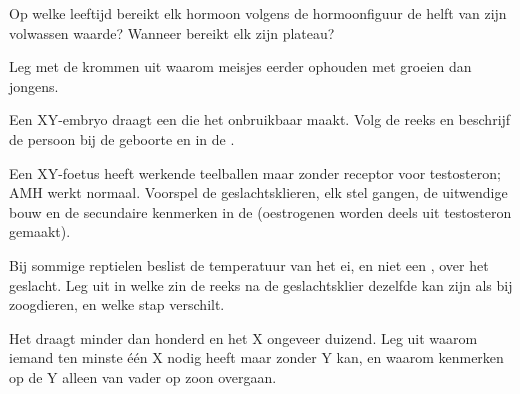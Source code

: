 \begin{exercise}[$\star\star$]\label{exo:g11:becoming-male-female:9}
Op welke leeftijd bereikt elk hormoon volgens de hormoonfiguur de helft
van zijn volwassen waarde? Wanneer bereikt elk zijn plateau?
\end{exercise}

\begin{exercise}[$\star\star$]\label{exo:g11:becoming-male-female:10}
Leg met de krommen uit waarom meisjes eerder ophouden met groeien dan
jongens.
\end{exercise}

\begin{exercise}[$\star\star$]\label{exo:g11:becoming-male-female:11}
Een XY-embryo draagt een  die het  onbruikbaar maakt.
Volg de reeks en beschrijf de persoon bij de geboorte en in de .
\end{exercise}

\begin{exercise}[$\star\star\star$]\label{exo:g11:becoming-male-female:12}
Een XY-foetus heeft werkende teelballen maar  zonder receptor voor
testosteron; AMH werkt normaal. Voorspel de geslachtsklieren, elk stel
gangen, de uitwendige bouw en de secundaire kenmerken in de 
(oestrogenen worden deels uit testosteron gemaakt).
\end{exercise}

\begin{exercise}[$\star\star\star$]\label{exo:g11:becoming-male-female:13}
Bij sommige reptielen beslist de temperatuur van het ei, en niet een
, over het geslacht. Leg uit in welke zin de reeks na de
geslachtsklier dezelfde kan zijn als bij zoogdieren, en welke stap
verschilt.
\end{exercise}

\begin{exercise}[$\star\star\star$]\label{exo:g11:becoming-male-female:14}
Het  draagt minder dan honderd  en het X ongeveer
duizend. Leg uit waarom iemand ten minste één X nodig heeft maar zonder Y
kan, en waarom kenmerken op de Y alleen van vader op zoon overgaan.
\end{exercise}

